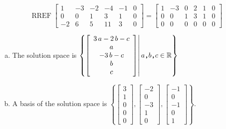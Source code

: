 \begin{exerciseAnswer} 


\[\operatorname{RREF} \left[\begin{array}{ccccc|c}
1 & -3 & -2 & -4 & -1 & 0 \\
0 & 0 & 1 & 3 & 1 & 0 \\
-2 & 6 & 5 & 11 & 3 & 0
\end{array}\right] = \left[\begin{array}{ccccc|c}
1 & -3 & 0 & 2 & 1 & 0 \\
0 & 0 & 1 & 3 & 1 & 0 \\
0 & 0 & 0 & 0 & 0 & 0
\end{array}\right] \]


\begin{enumerate}[(a)]
\item The solution space is \( \left\{ \left[\begin{array}{c}
3 \, a - 2 \, b - c \\
a \\
-3 \, b - c \\
b \\
c
\end{array}\right] \middle|\,a\text{\texttt{,}}b\text{\texttt{,}}c\in\mathbb{R}\right\} \)
\item A basis of the solution space is \( \left\{ \left[\begin{array}{c}
3 \\
1 \\
0 \\
0 \\
0
\end{array}\right] , \left[\begin{array}{c}
-2 \\
0 \\
-3 \\
1 \\
0
\end{array}\right] , \left[\begin{array}{c}
-1 \\
0 \\
-1 \\
0 \\
1
\end{array}\right] \right\} \).
\end{enumerate}
    
\end{exerciseAnswer}
    
